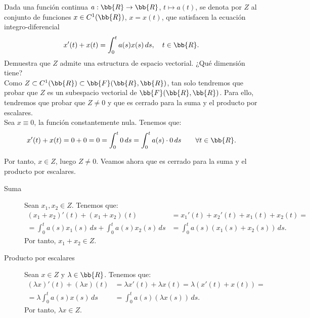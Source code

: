 \documentclass[12pt]{article}
\begin{document}
    \begin{ejercicio}
        Dada una función continua $a:\bb{R}\to \bb{R}$, $t \mapsto a(t)$, se denota por $Z$ al conjunto de funciones $x \in C^1(\bb{R})$, $x = x(t)$, que satisfacen la ecuación integro-diferencial
        \begin{equation}\label{eq:ed1}
            x'(t) + x(t) = \int_0^t a(s)x(s)\,ds, \quad t \in \bb{R}.
        \end{equation}
        Demuestra que $Z$ admite una estructura de espacio vectorial. ¿Qué dimensión tiene?\\

        Como $Z\subset C^1(\bb{R})\subset \bb{F}(\bb{R},\bb{R})$, tan solo tendremos que probar que $Z$ es un subespacio vectorial de $\bb{F}(\bb{R},\bb{R})$. Para ello, tendremos que probar que $Z\neq 0$ y que es cerrado para la suma y el producto por escalares.\\

        Sea $x\equiv 0$, la función constantemente nula. Tenemos que:
        \begin{equation*}
            x'(t) + x(t) = 0 + 0 = 0 = \int_0^t 0\,ds = \int_0^t a(s)\cdot 0\,ds\qquad \forall t \in \bb{R}.
        \end{equation*}

        Por tanto, $x\in Z$, luego $Z\neq 0$. Veamos ahora que es cerrado para la suma y el producto por escalares.
        \begin{description}
            \item[Suma] Sean $x_1,x_2\in Z$. Tenemos que:
            \begin{align*}
                (x_1+x_2)'(t) + (x_1+x_2)(t) &= x_1'(t) + x_2'(t) + x_1(t) + x_2(t) =\\
                = \int_0^t a(s)x_1(s)\,ds + \int_0^t a(s)x_2(s)\,ds &= \int_0^t a(s)(x_1(s)+x_2(s))\,ds.
            \end{align*}
            Por tanto, $x_1+x_2\in Z$.

            \item[Producto por escalares] Sean $x\in Z$ y $\lambda \in \bb{R}$. Tenemos que:
            \begin{align*}
                (\lambda x)'(t) + (\lambda x)(t) &= \lambda x'(t) + \lambda x(t) = \lambda(x'(t) + x(t)) =\\
                = \lambda \int_0^t a(s)x(s)\,ds &= \int_0^t a(s)(\lambda x(s))\,ds.
            \end{align*}
            Por tanto, $\lambda x\in Z$.
        \end{description}


\end{ejercicio}
\end{document}
